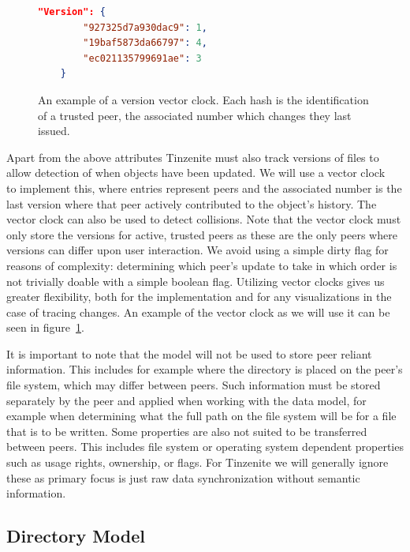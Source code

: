 \begin{figure}[htp]
    \begin{lstlisting}[language=json,firstnumber=0]
    "Version": {
        "927325d7a930dac9": 1,
        "19baf5873da66797": 4,
        "ec021135799691ae": 3
    }
    \end{lstlisting}
\caption[Version JSON]{An example of a version vector clock. Each hash is the identification of a trusted peer, the associated number which changes they last issued.}
\label{json:version_model}
\end{figure}

Apart from the above attributes Tinzenite must also track versions of files to allow detection of when objects have been updated.
We will use a vector clock~\cite{mattern1989virtual} to implement this, where entries represent peers and the associated number is the last version where that peer actively contributed to the object's history.
The vector clock can also be used to detect collisions.
Note that the vector clock must only store the versions for active, trusted peers as these are the only peers where versions can differ upon user interaction.
We avoid using a simple dirty flag for reasons of complexity: determining which peer's update to take in which order is not trivially doable with a simple boolean flag.
Utilizing vector clocks gives us greater flexibility, both for the implementation and for any visualizations in the case of tracing changes.
An example of the vector clock as we will use it can be seen in figure~\ref{json:version_model}.

It is important to note that the model will not be used to store peer reliant information.
This includes for example where the directory is placed on the peer's file system, which may differ between peers.
Such information must be stored separately by the peer and applied when working with the data model, for example when determining what the full path on the file system will be for a file that is to be written.
Some properties are also not suited to be transferred between peers.
This includes file system or operating system dependent properties such as usage rights, ownership, or flags.
For Tinzenite we will generally ignore these as primary focus is just raw data synchronization without semantic information.

\subsection{Directory Model}
\label{sec:dir_model}

